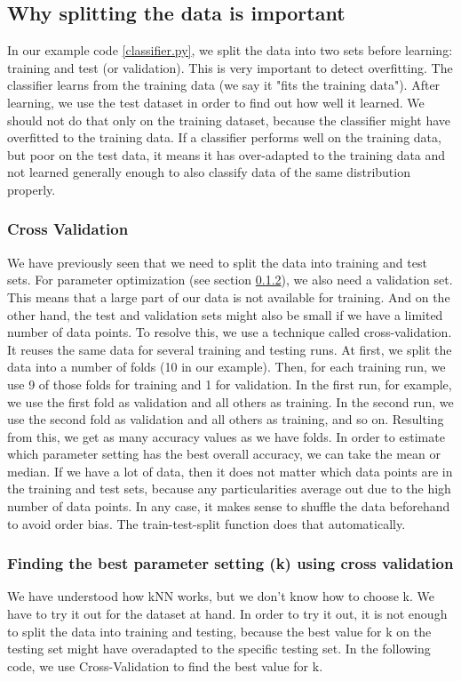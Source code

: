 \documentclass[10pt,a4paper]{article}
\begin{document}
\subsection{Why splitting the data is important}
In our example code \ref{classifier.py}, we split the data into two sets before learning: training and test (or validation). This is very important to detect overfitting. The classifier learns from the training data (we say it "fits the training data"). After learning, we use the test dataset in order to find out how well it learned. We should not do that only on the training dataset, because the classifier might have overfitted to the training data. If a classifier performs well on the training data, but poor on the test data, it means it has over-adapted to the training data and not learned generally enough to also classify data of the same distribution properly.

\subsubsection{Cross Validation}
We have previously seen that we need to split the data into training and test sets. For parameter optimization (see section \ref{subsubsec:find_best_k}), we also need a validation set. This means that a large part of our data is not available for training. And on the other hand, the test and validation sets might also be small if we have a limited number of data points.
To resolve this, we use a technique called cross-validation. It reuses the same data for several training and testing runs. At first, we split the data into a number of folds (10 in our example). Then, for each training run, we use 9 of those folds for training and 1 for validation. In the first run, for example, we use the first fold as validation and all others as training. In the second run, we use the second fold as validation and all others as training, and so on.
Resulting from this, we get as many accuracy values as we have folds. In order to estimate which parameter setting has the best overall accuracy, we can take the mean or median.
If we have a lot of data, then it does not matter which data points are in the training and test sets, because any particularities average out due to the high number of data points. In any case, it makes sense to shuffle the data beforehand to avoid order bias. The train-test-split function does that automatically.
\subsubsection{Finding the best parameter setting (k) using cross validation}
\label{subsubsec:find_best_k}
We have understood how kNN works, but we don't know how to choose k. We have to try it out for the dataset at hand. In order to try it out, it is not enough to split the data into training and testing, because the best value for k on the testing set might have overadapted to the specific testing set.
In the following code, we use Cross-Validation to find the best value for k.
\label{classification_with_scikit_learn.py}
\end{document}
